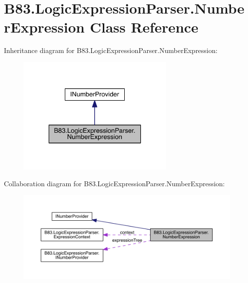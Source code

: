 \hypertarget{class_b83_1_1_logic_expression_parser_1_1_number_expression}{}\section{B83.\+Logic\+Expression\+Parser.\+Number\+Expression Class Reference}
\label{class_b83_1_1_logic_expression_parser_1_1_number_expression}


Inheritance diagram for B83.\+Logic\+Expression\+Parser.\+Number\+Expression\+:\nopagebreak
\begin{figure}[H]
\begin{center}
\leavevmode
\includegraphics[width=220pt]{class_b83_1_1_logic_expression_parser_1_1_number_expression__inherit__graph}
\end{center}
\end{figure}


Collaboration diagram for B83.\+Logic\+Expression\+Parser.\+Number\+Expression\+:\nopagebreak
\begin{figure}[H]
\begin{center}
\leavevmode
\includegraphics[width=350pt]{class_b83_1_1_logic_expression_parser_1_1_number_expression__coll__graph}
\end{center}
\end{figure}
